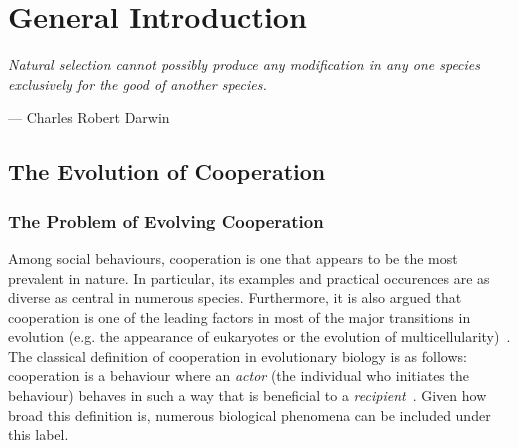 \chapter{General Introduction}

\epigraph{\textit{Natural selection cannot possibly produce any modification in any one species exclusively for the good of another species.}}{--- \textup{Charles Robert Darwin}}

\minitoc[n] %


\section{The Evolution of Cooperation}

  \subsection{The Problem of Evolving Cooperation}

    Among social behaviours, cooperation is one that appears to be the most prevalent in nature. In particular, its examples and practical occurences are as diverse as central in numerous species. Furthermore, it is also argued that cooperation is one of the leading factors in most of the major transitions in evolution (e.g. the appearance of eukaryotes or the evolution of multicellularity)~\parencite{Szathmary1995}. The classical definition of cooperation in evolutionary biology is as follows: cooperation is a behaviour where an \emph{actor} (the individual who initiates the behaviour) behaves in such a way that is beneficial to a \emph{recipient}~\parencite{West2007a}. Given how broad this definition is, numerous biological phenomena can be included under this label. 

